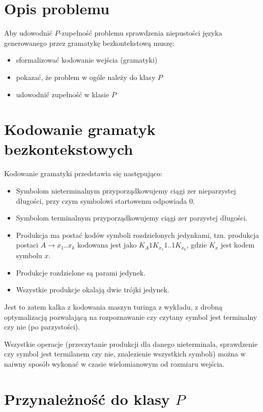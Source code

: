 \documentclass[a4paper,11pt]{article}
\begin{document}
\section*{Opis problemu}

Aby udowodnić $P$-zupełność problemu sprawdzenia niepustości języka generowanego
przez gramatykę bezkontekstową muszę:

\begin{itemize}
  \item{sformalizować kodowanie wejścia (gramatyki)}
  \item{pokazać, że problem w ogóle należy do klasy $P$}
  \item{udowodnić zupełność w klasie $P$}
\end{itemize}


\section*{Kodowanie gramatyk bezkontekstowych}

Kodowanie gramatyki przedstawia się następująco:
\begin{itemize}
  \item{Symbolom nieterminalnym przyporządkowujemy ciągi zer nieparzystej
        długości, przy czym symbolowi startowemu odpowiada $0$.}
  \item{Symbolom terminalnym przyporządkowujemy ciągi zer parzystej długości.}
  \item{Produkcja ma postać kodów symboli rozdzielonych jedynkami, tzn.
        produkcja postaci $A \rightarrow x_{1}..x_{k}$ kodowana jest jako
        $K_{A} 1 K_{x_{1}} 1 .. 1 K_{x_{k}} $, gdzie $K_x$ jest kodem symbolu
        $x$.}
  \item{Produkcje rozdzielone są parami jedynek.}
  \item{Wszystkie produkcje okalają dwie trójki jedynek.}
\end{itemize}
Jest to zatem kalka z kodowania maszyn turinga z wykładu, z drobną optymalizacją
pozwalającą na rozpoznawanie czy czytany symbol jest terminalny czy nie (po
parzystości).

Wszystkie operacje (przeczytanie produkcji dla danego nieterminala, sprawdzenie
czy symbol jest termilanem czy nie, znalezienie wszystkich symboli) można
w naiwny sposób wykonać w czasie wielomianowym od rozmiaru wejścia.



\section*{Przynależność do klasy $P$}
\end{document}
